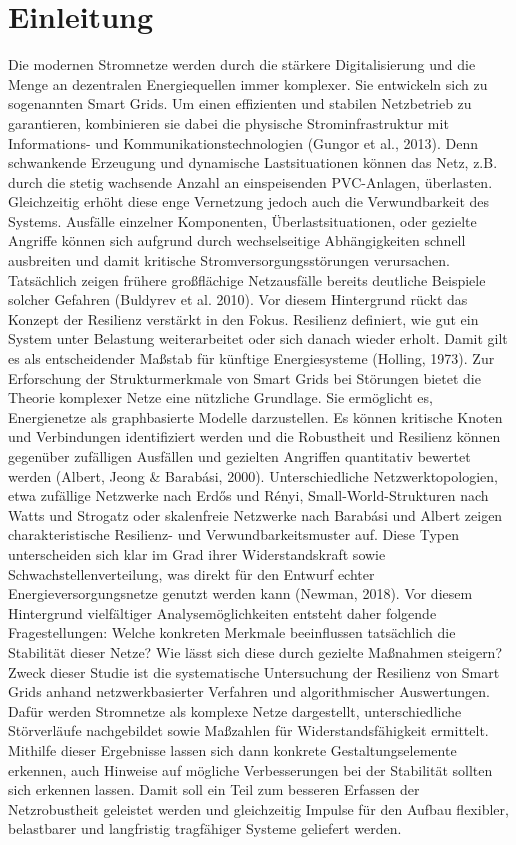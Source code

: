 
\section{Einleitung}
Die modernen Stromnetze werden durch die stärkere Digitalisierung und die Menge an dezentralen Energiequellen immer komplexer. Sie entwickeln sich zu sogenannten Smart Grids. Um einen effizienten und stabilen Netzbetrieb zu garantieren, kombinieren sie dabei die physische Strominfrastruktur mit Informations- und Kommunikationstechnologien (Gungor et al., 2013). Denn schwankende Erzeugung und dynamische Lastsituationen können das Netz, z.B. durch die stetig wachsende Anzahl an einspeisenden PVC-Anlagen, überlasten. Gleichzeitig erhöht diese enge Vernetzung jedoch auch die Verwundbarkeit des Systems. Ausfälle einzelner Komponenten, Überlastsituationen, oder gezielte Angriffe können sich aufgrund durch wechselseitige Abhängigkeiten schnell ausbreiten und damit kritische Stromversorgungsstörungen verursachen. Tatsächlich zeigen frühere großflächige Netzausfälle bereits deutliche Beispiele solcher Gefahren (Buldyrev et al. 2010).
Vor diesem Hintergrund rückt das Konzept der Resilienz verstärkt in den Fokus. Resilienz definiert, wie gut ein System unter Belastung weiterarbeitet oder sich danach wieder erholt. Damit gilt es als entscheidender Maßstab für künftige Energiesysteme (Holling, 1973).
Zur Erforschung der Strukturmerkmale von Smart Grids bei Störungen bietet die Theorie komplexer Netze eine nützliche Grundlage. Sie ermöglicht es, Energienetze als graphbasierte Modelle darzustellen. Es können kritische Knoten und Verbindungen identifiziert werden und die Robustheit und Resilienz können gegenüber zufälligen Ausfällen und gezielten Angriffen quantitativ bewertet werden (Albert, Jeong & Barabási, 2000). Unterschiedliche Netzwerktopologien, etwa zufällige Netzwerke nach Erdős und Rényi, Small-World-Strukturen nach Watts und Strogatz oder skalenfreie Netzwerke nach Barabási und Albert zeigen charakteristische Resilienz- und Verwundbarkeitsmuster auf. Diese Typen unterscheiden sich klar im Grad ihrer Widerstandskraft sowie Schwachstellenverteilung, was direkt für den Entwurf echter Energieversorgungsnetze genutzt werden kann (Newman, 2018). Vor diesem Hintergrund vielfältiger Analysemöglichkeiten entsteht daher folgende Fragestellungen: Welche konkreten Merkmale beeinflussen tatsächlich die Stabilität dieser Netze? Wie lässt sich diese durch gezielte Maßnahmen steigern?
Zweck dieser Studie ist die systematische Untersuchung der Resilienz von Smart Grids anhand netzwerkbasierter Verfahren und algorithmischer Auswertungen. Dafür werden Stromnetze als komplexe Netze dargestellt, unterschiedliche Störverläufe nachgebildet sowie Maßzahlen für Widerstandsfähigkeit ermittelt. Mithilfe dieser Ergebnisse lassen sich dann konkrete Gestaltungselemente erkennen, auch Hinweise auf mögliche Verbesserungen bei der Stabilität sollten sich erkennen lassen. Damit soll ein Teil zum besseren Erfassen der Netzrobustheit geleistet werden und gleichzeitig Impulse für den Aufbau flexibler, belastbarer und langfristig tragfähiger Systeme geliefert werden.
 